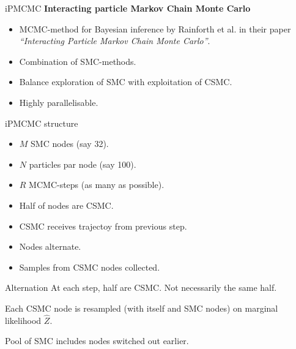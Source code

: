 \documentclass[usenames,dvipsnames,10pt]{beamer}
\begin{document}
\begin{frame}[fragile]{iPMCMC}
    \textbf{Interacting particle Markov Chain Monte Carlo}

    \bigskip

    \begin{itemize}
        
        \item MCMC-method for Bayesian inference by Rainforth et al. in their paper \emph{``Interacting Particle Markov Chain Monte Carlo''}.

\item Combination of SMC-methods.

\item Balance exploration of SMC with exploitation of CSMC.

\item Highly parallelisable.
    \end{itemize}

\end{frame}

\begin{frame}[fragile]{iPMCMC structure}
    \begin{itemize}
        
        \item \alert{$M$} SMC nodes (say 32).

\item \alert{$N$} particles par node (say 100).

\item \alert{$R$} MCMC-steps (as many as possible).

\item Half of nodes are CSMC.

\item CSMC receives trajectoy from previous step.

\item Nodes alternate.

\item Samples from CSMC nodes collected.
    \end{itemize}
    
\end{frame}

\begin{frame}[fragile]{Alternation}
    At each step, half are CSMC. Not necessarily the same half.

    Each CSMC node is resampled (with itself and SMC nodes) on marginal likelihood $\hat Z$.

    Pool of SMC includes nodes switched out earlier.
\end{frame}
\end{document}
